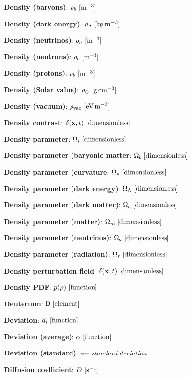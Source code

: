 \documentclass[a4paper,10pt]{article}
\begin{document}
{\noindent}\textbf{Density (baryons)}: $\rho_b ~ [{\rm m^{-3}}]$

{\noindent}\textbf{Density (dark energy)}: $\rho_\Lambda ~ [{\rm kg\,m^{-3}}]$

{\noindent}\textbf{Density (neutrinos)}: $\rho_\nu ~ [{\rm m^{-3}}]$

{\noindent}\textbf{Density (neutrons)}: $\rho_b ~ [{\rm m^{-3}}]$

{\noindent}\textbf{Density (protons)}: $\rho_b ~ [{\rm m^{-3}}]$

{\noindent}\textbf{Density (Solar value)}: $\rho_\odot ~ [{\rm g\,cm^{-3}}]$

{\noindent}\textbf{Density (vacuum)}: $\rho_\mathrm{vac} ~ [{\rm eV\,m^{-3}}]$

{\noindent}\textbf{Density contrast}: $\delta(\mathbf{x},t) ~ [{\rm dimensionless}]$

{\noindent}\textbf{Density parameter}: $\Omega_i ~ [{\rm dimensionless}]$

{\noindent}\textbf{Density parameter (baryonic matter}: $\Omega_b ~
[{\rm dimensionless}]$

{\noindent}\textbf{Density parameter (curvature}: $\Omega_\kappa ~ [{\rm dimensionless}]$

{\noindent}\textbf{Density parameter (dark energy)}: $\Omega_\Lambda ~ [{\rm dimensionless}]$

{\noindent}\textbf{Density parameter (dark matter)}: $\Omega_c ~ [{\rm dimensionless}]$

{\noindent}\textbf{Density parameter (matter)}: $\Omega_m ~ [{\rm dimensionless}]$

{\noindent}\textbf{Density parameter (neutrinos)}: $\Omega_\nu ~ [{\rm dimensionless}]$

{\noindent}\textbf{Density parameter (radiation)}: $\Omega_r ~ [{\rm dimensionless}]$

{\noindent}\textbf{Density perturbation field}: $\delta(\mathbf{x},t) ~ [{\rm dimensionless}]$

{\noindent}\textbf{Density PDF}: $p(\rho) ~ [{\rm function}]$

{\noindent}\textbf{Deuterium}: ${\rm D} ~ [{\rm element}]$

{\noindent}\textbf{Deviation}: $d_i ~ [{\rm function}]$

{\noindent}\textbf{Deviation (average)}: $\alpha ~ [{\rm function}]$

{\noindent}\textbf{Deviation (standard)}: see \textit{standard deviation}

{\noindent}\textbf{Diffusion coefficient}: $D ~ [{\rm s^{-1}}]$
\end{document}
